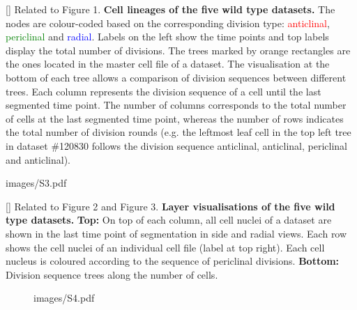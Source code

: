 []{
Related to Figure 1.
{\bf Cell lineages of the five wild type datasets.} The nodes are colour-coded based on the corresponding division type: \textcolor{red}{anticlinal}, \textcolor{green}{periclinal} and \textcolor{blue}{radial}. Labels on the left show the time points and top labels display the total number of divisions. The trees marked by orange rectangles are the ones located in the master cell file of a dataset. The visualisation at the bottom of each tree allows a comparison of division sequences between different trees. Each column represents the division sequence of a cell until the last segmented time point. The number of columns corresponds to the total number of cells at the last segmented time point, whereas the number of rows indicates the total number of division rounds (e.g. the leftmost leaf cell in the top left tree in dataset \#120830 follows the division sequence anticlinal, anticlinal, periclinal and anticlinal).
}
\label{fig:S2}
%
\clearpage
%
\begin{sidewaysfigure}
\centering
	\begin{overpic}[width=1.\linewidth]{images/S3.pdf}
	\end{overpic}
\end{sidewaysfigure}
\clearpage
{}[]{
Related to Figure 2 and Figure 3.
{\bf Layer visualisations of the five wild type datasets.} {\bf Top:} On top of each column, all cell nuclei of a dataset are shown in the last time point of segmentation in side and radial views. Each row shows the cell nuclei of an individual cell file (label at top right). Each cell nucleus is coloured according to the sequence of periclinal divisions. {\bf Bottom:} Division sequence trees along the number of cells.
}
\label{fig:S3}
%
\clearpage
%
\begin{figure}[htbp]
\centering
	\begin{overpic}[width=1.\linewidth]{images/S4.pdf}
	\end{overpic}
\end{figure}
\clearpage
